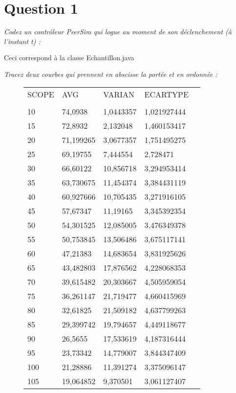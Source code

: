 \documentclass[11pt,a4paper,sans]{report}
\begin{document}
	\section{Question 1}
	\textit{Codez un contrôleur PeerSim qui logue au moment de son déclenchement (à l’instant
		t) :}
	\par Ceci correspond à la classe Echantillon.java

	\textit{Tracez deux courbes qui prennent en abscisse la portée et en ordonnée :}

	\begin{figure}[H]
		\centering
		\begin{tabular}{lllll}
			SCOPE   & AVG       & VARIAN    & ECARTYPE    &  \\
				&           &           &             &  \\
			10  & 74,0938   & 1,0443357 & 1,021927444 &  \\
			15  & 72,8932   & 2,132048  & 1,460153417 &  \\
			20  & 71,199265 & 3,0677357 & 1,751495275 &  \\
			25  & 69,19755  & 7,444554  & 2,728471    &  \\
			30  & 66,60122  & 10,856718 & 3,294953414 &  \\
			35  & 63,730675 & 11,454374 & 3,384431119 &  \\
			40  & 60,927666 & 10,705435 & 3,271916105 &  \\
			45  & 57,67347  & 11,19165  & 3,345392354 &  \\
			50  & 54,301525 & 12,085005 & 3,476349378 &  \\
			55  & 50,753845 & 13,506486 & 3,675117141 &  \\
			60  & 47,21383  & 14,683654 & 3,831925626 &  \\
			65  & 43,482803 & 17,876562 & 4,228068353 &  \\
			70  & 39,615482 & 20,303667 & 4,505959054 &  \\
			75  & 36,261147 & 21,719477 & 4,660415969 &  \\
			80  & 32,61825  & 21,509182 & 4,637799263 &  \\
			85  & 29,399742 & 19,794657 & 4,449118677 &  \\
			90  & 26,5655   & 17,533619 & 4,187316444 &  \\
			95  & 23,73342  & 14,779007 & 3,844347409 &  \\
			100 & 21,28886  & 11,391274 & 3,375096147 &  \\
			105 & 19,064852 & 9,370501  & 3,061127407 &  \\

\end{tabular}
\end{figure}
\end{document}
